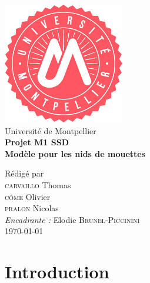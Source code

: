 \documentclass[frenchb]{report}
\newcommand{\1}{\mathbbm{1}}
\theoremstyle{definition}\newtheorem{defn}{Définition}
\theoremstyle{definition}\newtheorem{exm}{Exemple}
\theoremstyle{definition}\newtheorem{rem}{Remarque}
\begin{document}
\begin{titlepage}

\begin{center}
\includegraphics[scale=0.5]{logo.png}\\[1cm]
{\LARGE Université de Montpellier}\\[1.5cm]
\linespread{1.2}\huge {\bfseries Projet M1 SSD }\\[0.5cm]
\linespread{1.2}\LARGE {\bfseries Modèle pour les nids de mouettes}\\[1.5cm]
\linespread{1}

{\large Rédigé par\\}
{\Large \textsc{carvaillo} Thomas}\\
{\Large \textsc{côme} Olivier}\\
{\Large \textsc{pralon} Nicolas}\\[1cm]
{\large \emph{Encadrante :} Elodie \textsc{Brunel-Piccinini}}\\[1cm] %
\today
\end{center}

\end{titlepage}
\tableofcontents
\newpage

\chapter*{Introduction}
\lipsum


\pagebreak
\end{document}
